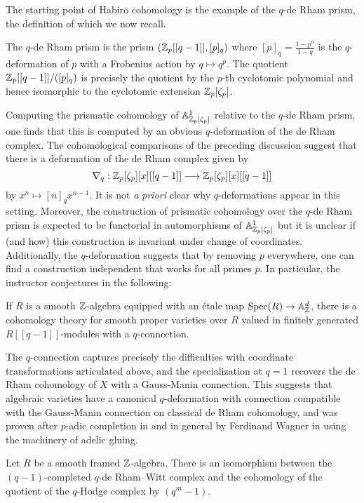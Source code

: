 The starting point of Habiro cohomology is the example of the $q$-de Rham prism, the definition of which we now recall. 
\begin{example}
    The $q$-de Rham prism is the prism $(\mathbb{Z}_{p}[[q-1]],[p]_{q})$ where $[p]_{q}=\frac{1-p^{n}}{1-q}$ is the $q$-deformation of $p$ with a Frobenius action by $q\mapsto q^{p}$. The quotient $\mathbb{Z}_{p}[[q-1]]/([p]_{q})$ is precisely the quotient by the $p$-th cyclotomic polynomial and hence isomorphic to the cyclotomic extension $\mathbb{Z}_{p}[\zeta_{p}]$. 
\end{example}
Computing the prismatic cohomology of $\mathbb{A}^{1}_{\mathbb{Z}_{p}[\zeta_{p}]}$ relative to the $q$-de Rham prism, one finds that this is computed by an obvious $q$-deformation of the de Rham complex. The cohomological comparisons of the preceding discussion suggest that there is a deformation of the de Rham complex given by 
$$\nabla_{q}:\mathbb{Z}_{p}[\zeta_{p}][x][[q-1]]\longrightarrow\mathbb{Z}_{p}[\zeta_{p}][x][[q-1]]$$
by $x^{n}\mapsto [n]_{q}x^{n-1}$. It is not \emph{a priori} clear why $q$-deformations appear in this setting. Moreover, the construction of prismatic cohomology over the $q$-de Rham prism is expected to be functorial in automorphisms of $\mathbb{A}^{1}_{\mathbb{Z}_{p}[\zeta_{p}]}$ but it is unclear if (and how) this construction is invariant under change of coordinates. Additionally, the $q$-deformation suggests that by removing $p$ everywhere, one can find a construction independent that works for all primes $p$. In particular, the instructor conjectures in \cite{qDeformations} the following:
\begin{conjecture}
    If $R$ is a smooth $\mathbb{Z}$-algebra equipped with an \'{e}tale map $\operatorname{Spec}(R)\to\mathbb{A}^{d}_{\mathbb{Z}}$, there is a cohomology theory for smooth proper varieties over $R$ valued in finitely generated $R[[q-1]]$-modules with a $q$-connection. 
\end{conjecture}
The $q$-connection captures precisely the difficulties with coordinate transformations articulated above, and the specialization at $q=1$ recovers the de Rham cohomology of $X$ with a Gauss-Manin connection. This suggests that algebraic varieties have a canonical $q$-deformation with connection compatible with the Gauss-Manin connection on classical de Rham cohomology, and was proven after $p$-adic completion in \cite{PrismsPrismatic} and in general by Ferdinand Wagner in \cite{WagnerQWittQHodge} using the machinery of adelic gluing.  
\begin{theorem}\label{thm: Wagner qHodge}
    Let $R$ be a smooth framed $\mathbb{Z}$-algebra. There is an isomorphism between the $(q-1)$-completed $q$-de Rham--Witt complex and the cohomology of the quotient of the $q$-Hodge complex by $(q^{m}-1)$. 
\end{theorem}
